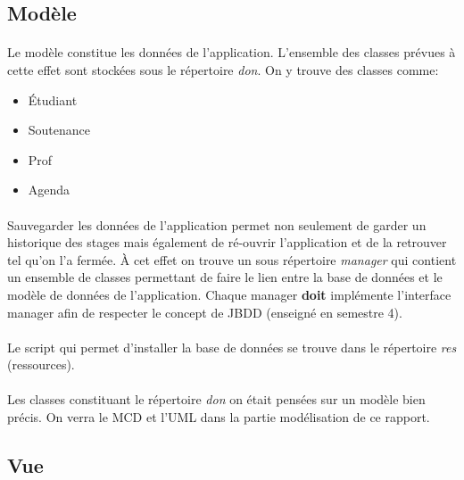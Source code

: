 \documentclass[a4paper,10pt]{report}
\begin{document}
		\subsection{Modèle}

			\paragraph*{}
			Le modèle constitue les données de l’application. L’ensemble des classes prévues à cette effet sont stockées sous le répertoire \textit{don}. On y trouve des classes comme:
			\begin{itemize}
				\item Étudiant
				\item Soutenance
				\item Prof
				\item Agenda
			\end{itemize} 

			\paragraph*{}
			Sauvegarder les données de l'application permet non seulement de garder un historique des stages mais également de ré-ouvrir l'application et de la retrouver tel qu'on l'a fermée. À cet effet on trouve un sous répertoire \textit{manager} qui contient un ensemble de classes permettant de faire le lien entre la base de données et le modèle de données de l'application. 
			Chaque manager \textbf{doit} implémente l'interface manager afin de respecter le concept de JBDD (enseigné en semestre 4).

		\paragraph*{}
		Le script qui permet d'installer la base de données se trouve dans le répertoire \textit{res} (ressources).

			\paragraph*{}
			Les classes constituant le répertoire \textit{don} on était pensées sur un modèle bien précis. On verra le MCD et l'UML dans la partie modélisation de ce rapport.

		\subsection{Vue}
\end{document}

